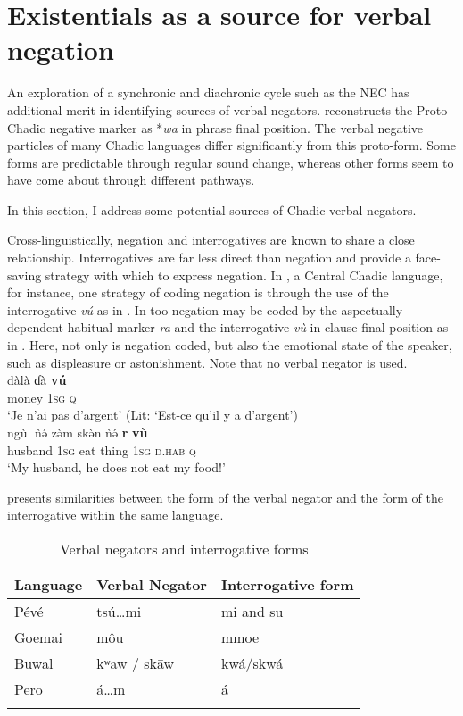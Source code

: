 \documentclass[output=paper]{langsci/langscibook}
\begin{document}
\section{Existentials as a source for verbal negation}\label{sec:3:6}

An exploration of a synchronic and diachronic cycle such as the NEC has additional merit in identifying sources of verbal negators. \citet{Newman1977} reconstructs the Proto-Chadic negative marker as *\textit{wa} in phrase final position. The verbal negative particles of many Chadic languages differ significantly from this proto-form. Some forms are predictable through regular sound change, whereas other forms seem to have come about through different pathways. 

 In this section, I address some potential sources of Chadic verbal negators. 

Cross-linguistically, negation and interrogatives are known to share a
close relationship. Interrogatives are far less direct than negation and
provide a face-saving strategy with which to express negation. In
, a Central Chadic language, for instance, one strategy of coding
negation is through the use of the interrogative \textit{v\'u} as in
. In  too negation may be coded by the
aspectually dependent habitual marker \textit{ra} and the interrogative
\textit{v\`u} in clause final position as in . Here,
not only is negation coded, but also the emotional state of the speaker,
such as displeasure or astonishment. Note that no verbal negator is used.
%
\ea\label{ex:daba-money}
\\ \gll d\`al\`a ɗ\`a
\textbf{v\'u}\\ money 1\textsc{sg} \textsc{q}\\ \glt `Je n'ai pas d'argent'
(Lit: `Est-ce qu'il y a d'argent') \z \ea\label{ex:mina-husband}
\\ \gll ng\`ul
\`n\'ə z\`əm sk\`ən \`n\'ə \textbf{r} \textbf{v\`u}\\ husband 1\textsc{sg}
eat thing 1\textsc{sg} \textsc{d.hab} \textsc{q}\\ \glt `My husband, he
does not eat my food!' \z

 presents similarities between the form of the verbal negator and the form of the interrogative within the same language.

\begin{table}
\begin{tabularx}{\textwidth}{XXX}
\lsptoprule
Language					&Verbal Negator					&Interrogative form\\\midrule
P\'ev\'e 						&ts\'u\ldots mi 					&mi and su\\
Goemai 						&môu							&mmoe\\
Buwal 						&kʷaw / sk\=aw 					&kw\'a/skw\'a\\
Pero 						&\'a\ldots m 						&\'a\\
\lspbottomrule
\end{tabularx}
\caption{Verbal negators and interrogative forms}
\label{tab:3:2}
\end{table}
\end{document}
